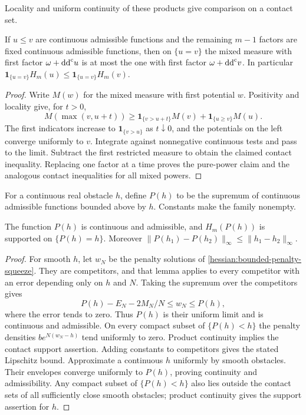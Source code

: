 Locality and uniform continuity of these products give comparison on a
contact set.

\begin{lemma}\label{hessian:contact-comparison}
If $u\leq v$ are continuous admissible functions and the remaining
$m-1$ factors are fixed continuous admissible functions, then on
$\{u=v\}$ the mixed measure with first factor $\omega+\mathrm{dd}^{\mathrm{c}} u$ is at
most the one with first factor $\omega+\mathrm{dd}^{\mathrm{c}} v$.
In particular $\mathbf1_{\{u=v\}}H_m(u)\leq
\mathbf1_{\{u=v\}}H_m(v)$.
\end{lemma}
\begin{proof}
Write $M(w)$ for the mixed measure with first potential $w$.
Positivity and locality give, for $t>0$,
\[
 M(\max(v,u+t))\geq
 \mathbf1_{\{v>u+t\}}M(v)+\mathbf1_{\{u\geq v\}}M(u).
\]
The first indicators increase to $\mathbf1_{\{v>u\}}$ as $t\downarrow0$,
and the potentials on the left converge uniformly to $v$.
Integrate against nonnegative continuous tests and pass to the limit.
Subtract the first restricted measure to obtain the claimed contact
inequality. Replacing one factor at a time proves the pure-power claim
and the analogous contact inequalities for all mixed powers.
\end{proof}

For a continuous real obstacle $h$, define $P(h)$ to be the supremum of
continuous admissible functions bounded above by $h$. Constants make the
family nonempty.

\begin{lemma}\label{hessian:continuous-obstacle-envelope}
The function $P(h)$ is continuous and admissible, and $H_m(P(h))$ is
supported on $\{P(h)=h\}$. Moreover
$\|P(h_1)-P(h_2)\|_\infty\leq\|h_1-h_2\|_\infty$.
\end{lemma}
\begin{proof}
For smooth $h$, let $w_N$ be the penalty solutions of
\cref{hessian:bounded-penalty-squeeze}. They are competitors, and that
lemma applies to every competitor with an error depending only on $h$
and $N$. Taking the supremum over the competitors gives
\[
 P(h)-E_N-2M_N/N\leq w_N\leq P(h),
\]
where the error tends to zero. Thus $P(h)$ is their uniform limit and
is continuous and admissible. On every compact subset of
$\{P(h)<h\}$ the penalty densities
$b e^{N(w_N-h)}$ tend uniformly to zero. Product continuity implies
the contact support assertion.
Adding constants to competitors gives the stated Lipschitz bound.
Approximate a continuous $h$ uniformly by smooth obstacles. Their
envelopes converge uniformly to $P(h)$, proving continuity and
admissibility. Any compact subset of $\{P(h)<h\}$ also lies outside the
contact sets of all sufficiently close smooth obstacles; product
continuity gives the support assertion for $h$.
\end{proof}

